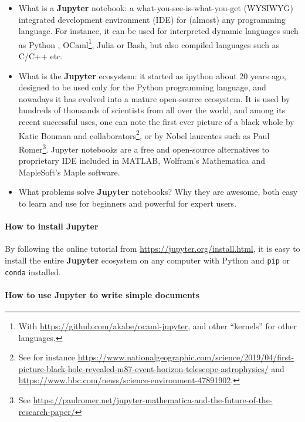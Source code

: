 \documentclass[runningheads]{llncs}
\newcommand{\Jupyter}{\textbf{Jupyter}}
\begin{document}
\begin{itemize}
    \item What is a \Jupyter{} notebook: a what-you-see-is-what-you-get (WYSIWYG) integrated development environment (IDE) for (almost) any programming language. For instance, it can be used for interpreted dynamic languages such as Python \cite{python}, OCaml\footnote{With \url{https://github.com/akabe/ocaml-jupyter}, and other ``kernels'' for other languages.}, Julia or Bash, but also compiled languages such as C/C++ etc.

    \item What is the \Jupyter{} ecosystem: it started as ipython \cite{ipython} about 20 years ago, designed to be used only for the Python programming language, and nowadays it has evolved into a mature open-source ecosystem.
    It is used by hundreds of thousands of scientists from all over the world, and among its recent successful uses, one can note the first ever picture of a black whole by Katie Bouman and collaborators\footnote{See for instance \url{https://www.nationalgeographic.com/science/2019/04/first-picture-black-hole-revealed-m87-event-horizon-telescope-astrophysics/} and \url{https://www.bbc.com/news/science-environment-47891902}.}, or by Nobel laureates such as Paul Romer\footnote{See \url{https://paulromer.net/jupyter-mathematica-and-the-future-of-the-research-paper/}}.
    Jupyter notebooks are a free and open-source alternatives to proprietary IDE included in MATLAB, Wolfram's Mathematica and MapleSoft's Maple software.

    \item What problems solve \Jupyter{} notebooks? Why they are awesome, both easy to learn and use for beginners and powerful for expert users.
\end{itemize}

\paragraph{How to install \Jupyter}

By following the online tutorial from \url{https://jupyter.org/install.html}, it is easy to install the entire \Jupyter{} ecosystem on any computer with Python and \texttt{pip} or \texttt{conda} installed.


\paragraph{How to use \Jupyter{} to write simple documents}
\end{document}
